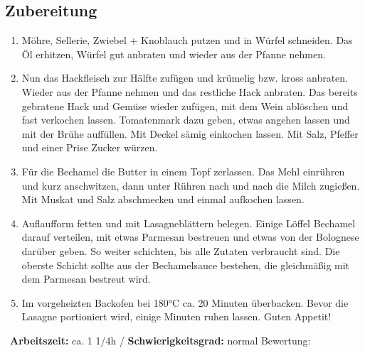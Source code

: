 \begin{minipage}[t]{0.58\textwidth}
\vspace{0pt}
\subsection*{Zubereitung}
\begin{enumerate}[leftmargin=*, itemindent=14pt]
\item Möhre, Sellerie, Zwiebel + Knoblauch putzen und in Würfel schneiden. Das Öl erhitzen, Würfel gut anbraten und wieder aus der Pfanne nehmen. 

\item Nun das Hackfleisch zur Hälfte zufügen und krümelig bzw. kross anbraten. Wieder aus der Pfanne nehmen und das restliche Hack anbraten. Das bereits gebratene Hack und Gemüse wieder zufügen, mit dem Wein ablöschen und fast verkochen lassen. Tomatenmark dazu geben, etwas angehen lassen und mit der Brühe auffüllen. Mit Deckel sämig einkochen lassen. Mit Salz, Pfeffer und einer Prise Zucker würzen.

\item Für die Bechamel die Butter in einem Topf zerlassen. Das Mehl einrühren und kurz anschwitzen, dann unter Rühren nach und nach die Milch zugießen. Mit Muskat und Salz abschmecken und einmal aufkochen lassen.

\item Auflaufform fetten und mit Lasagneblättern belegen. Einige Löffel Bechamel darauf verteilen, mit etwas Parmesan bestreuen und etwas von der Bolognese darüber geben. So weiter schichten, bis alle Zutaten verbraucht sind. Die oberste Schicht sollte aus der Bechamelsauce bestehen, die gleichmäßig mit dem Parmesan bestreut wird.

\item Im vorgeheizten Backofen bei 180°C ca. 20 Minuten überbacken. Bevor die Lasagne portioniert wird, einige Minuten ruhen lassen. Guten Appetit!
\end{enumerate}
\end{minipage}
\vfill
\decothreeright \, \textbf{Arbeitszeit:} ca. 1 1/4h / \textbf{Schwierigkeitsgrad:} normal \decothreeleft \hfill Bewertung:  \CIRCLE \CIRCLE \CIRCLE \CIRCLE \CIRCLE